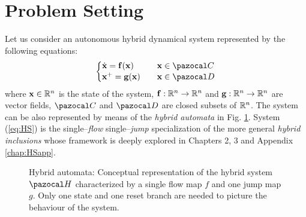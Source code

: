 \section{Problem Setting}\label{ProblemS}
Let us consider an autonomous hybrid dynamical system represented {by the following equations:}
%
\begin{equation}\label{eq:HS}
    \left\{ 
        \begin{matrix*}[l]\vspace{1pt}
            \dot{\x} = \mathbf{\mathbf{f}}(\x) &&\x\in\C\\
            \x^+ = \mathbf{g}(\x)&&\x\in\D
        \end{matrix*}
    \right.
\end{equation}
%
where $\mathbf{x}\in\mathbb{R}^n$ is the state of the system, $\mathbf{\mathbf{f}}:\mathbb{R}^n\rightarrow\mathbb{R}^n$ and $\mathbf{g}:\mathbb{R}^n\rightarrow\mathbb{R}^n$ are vector fields, $\C$ and $\D$ are closed subsets of $\mathbb{R}^n$.
The system can be also represented by means of the \textit{hybrid automata} in Fig. \ref{fig:HA}.      
System (\ref{eq:HS}) is the single--\textit{flow} single--\textit{jump} specialization of the more general \textit{hybrid inclusions} whose framework is deeply explored in Chapters 2, 3 and Appendix \ref{chap:HSapp}.%
%
\begin{figure}[!t]
	\centering
	\caption[Hybrid automata representiation of the system.]{Hybrid automata: Conceptual representation of the hybrid system $\Ha$ characterized by a single flow map $f$ and one jump map $g$. Only one state and one reset branch are needed to picture the behaviour of the system.}
	\label{fig:HA}
\end{figure}
%

